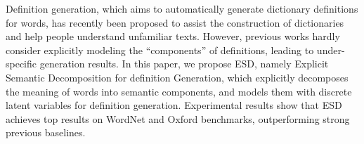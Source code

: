 Definition generation, which aims to automatically generate dictionary definitions for words, has recently been proposed to assist the construction of dictionaries and help people understand unfamiliar texts. However, previous works hardly consider explicitly modeling the ``components'' of definitions, leading to under-specific generation results. In this paper, we propose ESD, namely Explicit Semantic Decomposition for definition Generation, which explicitly decomposes the meaning of words into semantic components, and models them with discrete latent variables for definition generation. Experimental results show that ESD achieves top results on WordNet and Oxford benchmarks, outperforming strong previous baselines.
